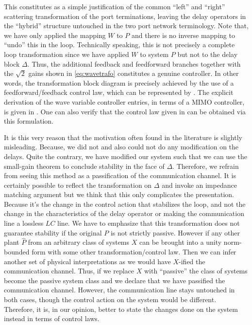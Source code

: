 This constitutes as a simple justification of the common \enquote{left} and \enquote{right} scattering transformation 
of the port terminations, leaving the delay operators in the \enquote{hybrid} structure untouched in the two port network 
terminology. Note that, we have only applied the mapping $W$ to $P$ and there is no inverse mapping to \enquote{undo} 
this in the loop. Technically speaking, this is not precisely a complete loop transformation since we have applied $W$
to system $P$ but not to the delay block $\Delta$. Thus, the additional feedback and feedforward branches together with 
the $\sqrt{2}$ gains shown in \eqref{eq:wavetrafo} constitutes a genuine controller. In other words, the transformation 
block diagram is precisely achieved by the use of a feedforward/feedback control law, which can be represented by 
. The explicit derivation of the wave variable controller entries, in terms of a MIMO controller, 
is given in \cite{christiansson2008}. One can also verify that the control law given in \cite{andersonspong} can be 
obtained via this formulation. 

It is this very reason that the motivation often found in the literature is slightly misleading. Because, we did not 
and also could not do any modification on the delays. Quite the contrary, we have modified our system such that we can use 
the small-gain theorem to conclude stability in the face of $\Delta$. Therefore, we refrain from seeing 
this method as a passification of the communication channel. It is certainly possible to reflect the transformation 
on $\Delta$ and invoke an impedance matching argument but we think that this 
only complicates the presentation. Because it's the change in the control action that stabilizes the loop, and not the 
change in the characteristics of the delay operator or making the communication line a lossless $LC$ line.
We have to emphasize that this transformation does not guarantee stability if the original $P$ is not strictly passive.
However if any other plant $\hat{P}$ from an arbitrary class of systems $X$ can be brought into a unity norm-bounded form 
with some other transformation/control law. Then we can infer another set of physical interpretations as we would have 
$X$-ified the communication channel. Thus, if we replace $X$ with \enquote{passive} the class of systems become the passive 
system class and we declare that we have passified the communication channel. However, the communication line stays untouched 
in both cases, though the control action on the system would be different. Therefore, it is, in our opinion, better to state 
the changes done on the system instead in terms of control laws.  


